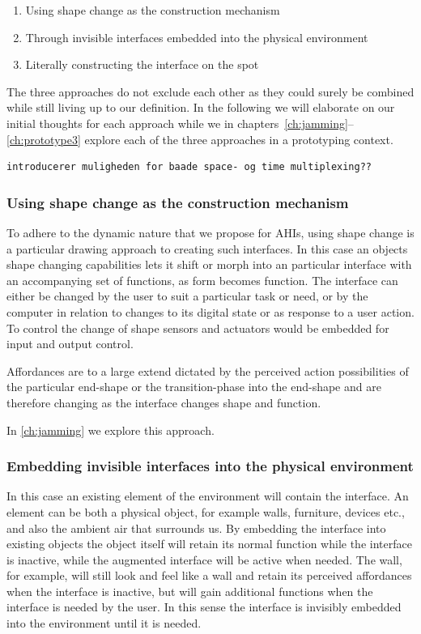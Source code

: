 \begin{enumerate}
	\item{Using shape change as the construction mechanism}
	\item{Through invisible interfaces embedded into the physical environment}
	\item{Literally constructing the interface on the spot}
\end{enumerate}

The three approaches do not exclude each other as they could surely be combined while still living up to our definition.
In the following we will elaborate on our initial thoughts for each approach while we in chapters~\autoref{ch:jamming}--\ref{ch:prototype3}  explore each of the three approaches in a prototyping context.
 
\begin{verbatim}
introducerer muligheden for baade space- og time multiplexing??
\end{verbatim}

\subsubsection{Using shape change as the construction mechanism}
To adhere to the dynamic nature that we propose for AHIs, using shape change is a particular drawing approach to creating such interfaces.
In this case an objects shape changing capabilities lets it shift or morph into an particular interface with an accompanying set of functions, as form becomes function.
The interface can either be changed by the user to suit a particular task or need, or by the computer in relation to changes to its digital state or as response to a user action.
To control the change of shape sensors and actuators would be embedded for input and output control.

Affordances are to a large extend dictated by the perceived action possibilities of the particular end-shape or the transition-phase into the end-shape and are therefore changing as the interface changes shape and function.

In \autoref{ch:jamming} we explore this approach.

\subsubsection{Embedding invisible interfaces into the physical environment}
In this case an existing element of the environment will contain the interface.
An element can be both a physical object, for example walls, furniture, devices etc., and also the ambient air  that surrounds us.
By embedding the interface into existing objects the object itself will retain its normal function while the interface is inactive, while the augmented interface will be active when needed. 
The wall, for example, will still look and feel like a wall and retain its perceived affordances when the interface is inactive, but will gain additional functions when the interface is needed by the user.
In this sense the interface is invisibly embedded into the environment until it is needed.

